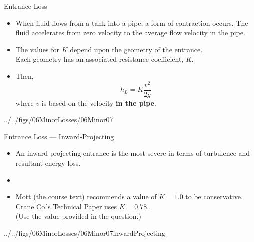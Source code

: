 \documentclass[9pt,xcolor={svgnames, x11names},professionalfonts, mathserif]{beamer}
\begin{document}

\begin{frame}{Entrance Loss}
 \begin{minipage}{0.45\columnwidth}
  \begin{itemize}
   \item When fluid flows from a tank into a pipe, a form of contraction occurs. The fluid accelerates from zero
         velocity to the average flow velocity in the pipe.\parm
   \item The values for $K$ depend upon the geometry of the entrance. \\Each geometry has an associated resistance
         coefficient, $K$. \par
   \item Then, $$h_L=K\frac{v^2}{2g}$$ where $v$ is based on the velocity {\bfseries in the pipe}.
  \end{itemize}
 \end{minipage}
 \hfill
 \begin{minipage}{0.5\columnwidth}
  \begin{cfig}[0.35]{../../figs/06MinorLosses/06Minor07}\end{cfig}
 \end{minipage}

\end{frame}


\begin{frame}{Entrance Loss --- Inward-Projecting}

 \begin{itemize}
  \item An inward-projecting entrance is the most severe in terms of turbulence and resultant energy loss.
  \item []
  \item Mott (the course text) recommends a value of $K=1.0$ to be conservative. Crane Co.'s Technical Paper
        uses $K=0.78$. \\(Use the value provided in the question.)
 \end{itemize}
 \par\vspace{-0.5cm}
 \begin{cfig}[0.6]{../../figs/06MinorLosses/06Minor07inwardProjecting}\end{cfig}

\end{frame}
\end{document}
